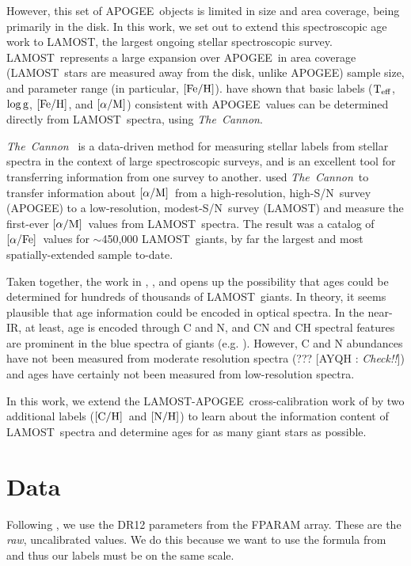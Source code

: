 \documentclass[12pt, preprint]{aastex}
\newcommand{\tc}{\textsl{The~Cannon}}
\newcommand{\apogee}{APOGEE}
\newcommand{\lamost}{LAMOST}
\newcommand{\teff}{\mbox{$\rm T_{eff}$}}
\newcommand{\logg}{\mbox{$\rm \log g$}}
\newcommand{\feh}{\mbox{$\rm [Fe/H]$}}
\newcommand{\afe}{\mbox{$\rm [\alpha/Fe]$}}
\newcommand{\alpham}{\mbox{$\rm [\alpha/M]$}}
\newcommand{\carbon}{\mbox{$\rm [C/H]$}}
\newcommand{\nitrogen}{\mbox{$\rm [N/H]$}}
\newcommand{\snr}{S/N}
\newcommand{\Comment}[2]{ [{\color{red}\sc #1 :} {{\color{cyan} \it #2}}]}
\begin{document}
However, this set of \apogee\ objects is limited in size and area coverage, 
being primarily in the disk.
In this work, we set out to extend this spectroscopic age work to
\lamost, the largest ongoing stellar spectroscopic survey. 
\lamost\ represents a large expansion over \apogee\ in area coverage
(\lamost\ stars are measured away from the disk, unlike \apogee)
sample size, and parameter range (in particular, \feh). 
\citet{Ho2016} have shown that
basic labels (\teff, \logg, \feh, and \alpham) consistent with 
\apogee\ values can be determined directly from \lamost\ spectra,
using \tc.

\tc\ \citep{Ness2015} is a data-driven method for measuring stellar labels 
from stellar spectra in the context of large spectroscopic surveys, 
and is an excellent tool for transferring information from one survey 
to another. 
\citet{Ho2016} used \tc\ to transfer information about \alpham\ from a
high-resolution, high-\snr\ survey (\apogee) to a low-resolution,
modest-\snr\ survey (\lamost) and measure the first-ever \alpham\ values
from \lamost\ spectra. 
The result was a catalog of \afe\ values for $\sim$450,000 \lamost\ giants, 
by far the largest and most spatially-extended sample to-date. 

Taken together, the work in \citet{Martig2016}, \citet{Ness2016}, and
\citet{Ho2016} opens up the possibility that ages could be determined
for hundreds of thousands of \lamost\ giants.
In theory, it seems plausible that age information could
be encoded in optical spectra.
In the near-IR, at least, age is encoded through C and N, and
CN and CH spectral features
are prominent in the blue spectra of giants 
(e.g. \citet{Martell2008}). However, C and N abundances
have not been measured from moderate resolution spectra (???
\Comment{AYQH}{Check!!}) and ages have certainly not been
measured from low-resolution spectra.

In this work, we extend the \lamost-\apogee\ cross-calibration 
work of \citet{Ho2016} by two additional labels (\carbon\ and \nitrogen) 
to learn about the information content of \lamost\ spectra
and determine ages for as many giant stars as possible.



\section{Data}
\label{sec:data}

Following \citet{Martig2016}, we use the DR12 parameters from the
FPARAM array. These are the \emph{raw}, uncalibrated values.
We do this because we want to use the formula from \citet{Martig2016}
and thus our labels must be on the same scale.
\end{document}
